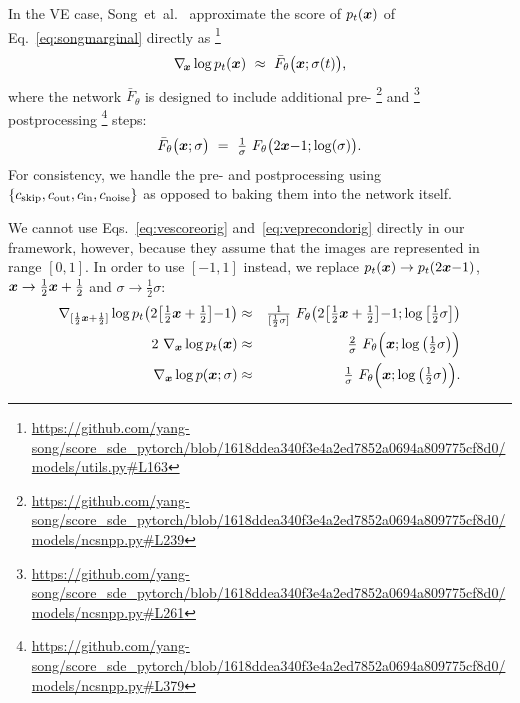 In the VE case, Song~et~al.~\cite{Song2021sde} approximate the score of $p_t(\boldsymbol{x})$ of Eq.~\ref{eq:songmarginal} directly as%
\footnote{\tiny\url{https://github.com/yang-song/score\_sde\_pytorch/blob/1618ddea340f3e4a2ed7852a0694a809775cf8d0/models/utils.py\#L163}}
\begin{equation}
  \nabla_{\hspace{-0.5mm}\boldsymbol{x}} \log p_t(\boldsymbol{x}) ~\approx~ \bar{F}_\theta\big( \boldsymbol{x}; \sigma(t) \big)
  \label{eq:vescoreorig}
  \text{,}
\end{equation}
where the network $\bar{F}_\theta$ is designed to include additional pre-%
\footnote{\tiny\url{https://github.com/yang-song/score\_sde\_pytorch/blob/1618ddea340f3e4a2ed7852a0694a809775cf8d0/models/ncsnpp.py\#L239}}
and%
\footnote{\tiny\url{https://github.com/yang-song/score\_sde\_pytorch/blob/1618ddea340f3e4a2ed7852a0694a809775cf8d0/models/ncsnpp.py\#L261}}
postprocessing%
\footnote{\tiny\url{https://github.com/yang-song/score\_sde\_pytorch/blob/1618ddea340f3e4a2ed7852a0694a809775cf8d0/models/ncsnpp.py\#L379}}
steps:
\begin{equation}
  \bar{F}_\theta\big( \boldsymbol{x}; \sigma \big) ~=~ \tfrac{1}{\sigma} ~F_\theta\big( 2 \boldsymbol{x} {-} 1; \log(\sigma) \big)
  \label{eq:veprecondorig}
  \text{.}
\end{equation}
For consistency, we handle the pre- and postprocessing using $\{c_\text{skip}, c_\text{out}, c_\text{in}, c_\text{noise}\}$ as opposed to baking them into the network itself.

We cannot use Eqs.~\ref{eq:vescoreorig} and~\ref{eq:veprecondorig} directly in our framework, however, because they assume that the images are represented in range $[0, 1]$.
In order to use $[-1, 1]$ instead, we replace $p_t(\boldsymbol{x}) \rightarrow p_t(2 \boldsymbol{x} {-} 1)$, $\boldsymbol{x} \rightarrow \tfrac{1}{2} \boldsymbol{x} + \tfrac{1}{2}$ and $\sigma \rightarrow \tfrac{1}{2} \sigma$:
\begin{eqnarray}
  \nabla_{[\frac{1}{2} \boldsymbol{x} + \frac{1}{2}]} \log p_t \big( 2 \big[ \tfrac{1}{2} \boldsymbol{x} + \tfrac{1}{2} \big] {-} 1 \big) &\approx& \tfrac{1}{[\frac{1}{2} \sigma]} ~F_\theta\big( 2 \big[ \tfrac{1}{2} \boldsymbol{x} + \tfrac{1}{2} \big] {-} 1; \log \big[ \tfrac{1}{2} \sigma \big] \big) \\
  2 ~\nabla_{\boldsymbol{x}} \log p_t(\boldsymbol{x}) &\approx& \tfrac{2}{\sigma} ~F_\theta\Big( \boldsymbol{x}; \log \big( \tfrac{1}{2} \sigma \big) \Big) \\
  \nabla_{\boldsymbol{x}} \log p(\boldsymbol{x}; \sigma) &\approx& \tfrac{1}{\sigma} ~F_\theta\Big( \boldsymbol{x}; \log \big( \tfrac{1}{2} \sigma \big) \Big)
  \label{eq:veprecondtemp}
  \text{.}
\end{eqnarray}

